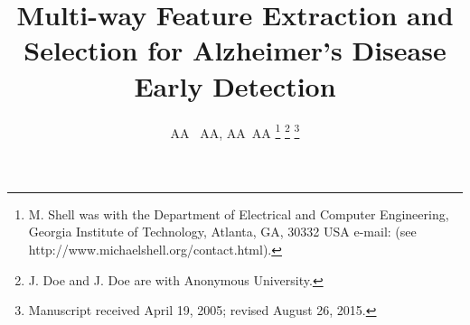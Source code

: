 \documentclass[journal]{IEEEtran}
\begin{document}
	\title{Multi-way Feature Extraction and Selection for  Alzheimer’s Disease Early Detection } 
	
	\author{AA ~AA,
		AA~AA%
		\thanks{M. Shell was with the Department
			of Electrical and Computer Engineering, Georgia Institute of Technology, Atlanta,
			GA, 30332 USA e-mail: (see http://www.michaelshell.org/contact.html).}%
		\thanks{J. Doe and J. Doe are with Anonymous University.}%
		\thanks{Manuscript received April 19, 2005; revised August 26, 2015.}}
	
	
\end{document}
